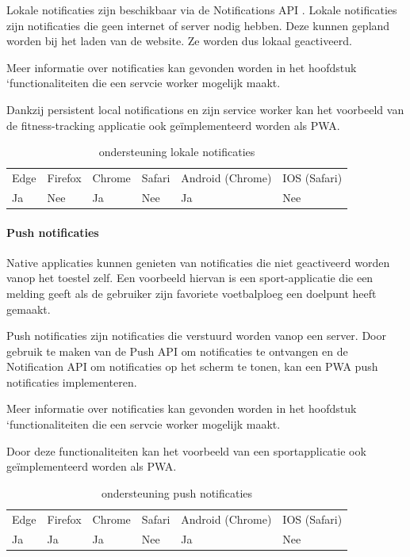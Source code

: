 Lokale notificaties zijn beschikbaar via de Notifications API \autocite{Gregg2020}. Lokale notificaties zijn notificaties die geen internet of server nodig hebben. Deze kunnen gepland worden bij het laden van de website. Ze worden dus lokaal geactiveerd.

Meer informatie over notificaties kan gevonden worden in het hoofdstuk ‘functionaliteiten die een servcie worker mogelijk maakt.

Dankzij persistent local notifications en zijn service worker kan het voorbeeld van de fitness-tracking applicatie ook geïmplementeerd worden als PWA.

\begin{table}[H]
	\centering
	\begin{tabular}{llllll}
		Edge & Firefox & Chrome & Safari & Android (Chrome) & IOS (Safari) \\
		Ja   & Nee      &  Ja     & Nee     & Ja               & Nee          
	\end{tabular}	
	\caption{ondersteuning lokale notificaties }
	\label{ondersteuning lokale notificaties}
\end{table}

\paragraph{Push notificaties}

Native applicaties kunnen genieten van notificaties die niet geactiveerd worden vanop het toestel zelf. Een voorbeeld hiervan is een sport-applicatie die een melding geeft als de gebruiker zijn favoriete voetbalploeg een doelpunt heeft gemaakt.

Push notificaties zijn notificaties die verstuurd worden vanop een server. Door gebruik te maken van de Push API \autocite{Sullivan2020} om notificaties te ontvangen en de Notification API om notificaties op het scherm te tonen, kan een PWA push notificaties implementeren. 

Meer informatie over notificaties kan gevonden worden in het hoofdstuk ‘functionaliteiten die een servcie worker mogelijk maakt.

Door deze functionaliteiten kan het voorbeeld van een sportapplicatie ook geïmplementeerd worden als PWA.

\begin{table}[H]
	\centering
	\begin{tabular}{llllll}
		Edge & Firefox & Chrome & Safari & Android (Chrome) & IOS (Safari) \\
		Ja   & Ja      &  Ja     & Nee     & Ja               & Nee          
	\end{tabular}	
	\caption{ondersteuning push notificaties }
	\label{ondersteuning push notificaties}
\end{table}



